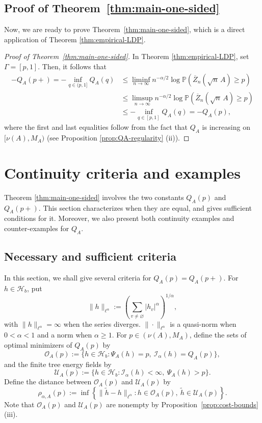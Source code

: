 \documentclass[a4paper, 11pt]{article}
\newcommand{\1}{\mathbf 1}
\theoremstyle{plain}
\begin{document}
\subsection{Proof of Theorem~\ref{thm:main-one-sided}}
Now, we are ready to prove Theorem~\ref{thm:main-one-sided}, which is a direct application of Theorem \ref{thm:empirical-LDP}.
\begin{proof}[Proof of Theorem~\ref{thm:main-one-sided}]
In Theorem \ref{thm:empirical-LDP}, set $\Gamma=[p,1]$. Then, it follows that
\begin{align*}
  -Q_A(p+)=-\inf_{q\in(p,1]}Q_A(q)
  &\leq
  \liminf_{n\to\infty}n^{-\alpha/2}
  \log\mathbb{P}\!\left(\overline Z_n(\sqrt n\,A)\geq p\right)\\
  &\leq
  \limsup_{n\to\infty}n^{-\alpha/2}
  \log\mathbb{P}\!\left(\overline Z_n(\sqrt n\,A)\geq p\right)\\
  &\leq
  -\inf_{q\in[p,1]}Q_A(q)=-Q_A(p),
\end{align*}
where the first and last equalities follow from the fact that $Q_A$ is increasing on $[\nu(A),M_A)$ (see Proposition \ref{prop:QA-regularity} (ii)).
\end{proof}

\section{Continuity criteria and examples}\label{5yehye6t5t}
Theorem \ref{thm:main-one-sided} involves the two constants \(Q_A(p)\) and \(Q_A(p+)\). This section characterizes when they are equal, and gives sufficient conditions for it. Moreover, we also present both continuity examples and counter-examples for $Q_A$.

\subsection{Necessary and sufficient criteria}
In this section, we shall give several criteria for $Q_A(p)=Q_A(p+)$. For $h\in\mathcal{H}_b$, put
\[
  \|h\|_{\ell^\alpha}
  :=\left(\sum_{v\neq\varnothing}|h_v|^\alpha\right)^{1/\alpha},
\]
with $\|h\|_{\ell^\alpha}=\infty$ when the series diverges. $\|\cdot\|_{\ell^\alpha}$ is a quasi-norm when \(0<\alpha<1\) and a norm when $\alpha\geq1$. For \(p\in(\nu(A),M_A)\), define the sets of optimal minimizers of $Q_A(p)$ by
\[
  \mathcal O_A(p)
  :=\{h\in\mathcal{H}_b:\Psi_A(h)=p,\ \mathcal{I_{\alpha}}(h)=Q_A(p)\},
\]
and the finite tree energy fields by
\[
  \mathcal U_A(p)
  :=\{h\in\mathcal{H}_b:\mathcal{I_{\alpha}}(h)<\infty,\ \Psi_A(h)>p\}.
\]
Define the distance between $\mathcal O_A(p)$ and $\mathcal U_A(p)$ by
\begin{equation}\label{eq:escape-radius}
  \rho_{\alpha,A}(p)
  :=\inf\left\{
    \|\widetilde h-h\|_{\ell^\alpha}:
    h\in\mathcal O_A(p),\ \widetilde h\in\mathcal U_A(p)
  \right\}.
\end{equation}
Note that \(\mathcal O_A(p)\) and $\mathcal U_A(p)$ are nonempty by
Proposition~\ref{prop:cost-bounds} (iii).
\end{document}
